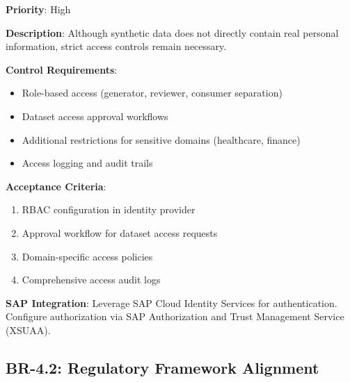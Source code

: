 \begin{tcolorbox}[colback=red!5,colframe=red!70,title=BR-4.1: Role-Based Access Control]
\textbf{Priority}: High

\textbf{Description}: Although synthetic data does not directly contain real
personal information, strict access controls remain necessary.

\textbf{Control Requirements}:
\begin{itemize}
  \item Role-based access (generator, reviewer, consumer separation)
  \item Dataset access approval workflows
  \item Additional restrictions for sensitive domains (healthcare, finance)
  \item Access logging and audit trails
\end{itemize}

\textbf{Acceptance Criteria}:
\begin{enumerate}
  \item RBAC configuration in identity provider
  \item Approval workflow for dataset access requests
  \item Domain-specific access policies
  \item Comprehensive access audit logs
\end{enumerate}

\textbf{SAP Integration}: Leverage SAP Cloud Identity Services for authentication.
Configure authorization via SAP Authorization and Trust Management Service (XSUAA).
\end{tcolorbox}

\subsection{BR-4.2: Regulatory Framework Alignment}

